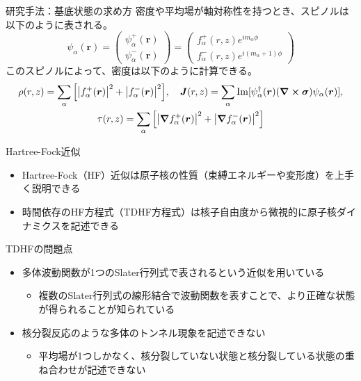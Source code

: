 \documentclass[12pt,aspectratio=169,xcolor=dvipsnames,table,dvipdfmx]{beamer}
\theoremstyle{definition}
\begin{document}
\begin{frame}{研究手法：基底状態の求め方}
密度や平均場が軸対称性を持つとき、スピノルは以下のように表される。
\begin{equation}
  \psi_{\alpha}(\bm{r}) =
  \begin{pmatrix}
    \psi_{\alpha}^{+}(\bm{r}) \\
    \psi_{\alpha}^{-}(\bm{r})
  \end{pmatrix}
  = 
  \begin{pmatrix}
    f^{+}_{\alpha}(r,z)e^{im_{\alpha}\phi} \\
    f^{-}_{\alpha}(r,z)e^{i(m_{\alpha}+1)\phi}
  \end{pmatrix}
\end{equation}
このスピノルによって、密度は以下のように計算できる。
\begin{gather}
  \rho(r,z) = \sum_{\alpha}\qty[\abs{f_{\alpha}^{+}(\bm{r})}^2+\abs{f_{\alpha}^{-}(\bm{r})}^2],\quad 
  \bm{J}(r,z) = \sum_{\alpha}\Im[\psi_{\alpha}^{\dagger}(\bm{r})(\bm{\nabla}\cross\bm{\sigma})\psi_{\alpha}(\bm{r})],\\
  \tau(r,z) = \sum_{\alpha}\qty[\abs{\bm{\nabla}f_{\alpha}^{+}(\bm{r})}^2+\abs{\bm{\nabla}f_{\alpha}^{-}(\bm{r})}^2]
\end{gather}
\end{frame}





\begin{frame}{Hartree-Fock近似}
  \begin{itemize}
    \item Hartree-Fock（HF）近似は原子核の性質（束縛エネルギーや変形度）を上手く説明できる
    \item 時間依存のHF方程式（TDHF方程式）は核子自由度から微視的に原子核ダイナミクスを記述できる
  \end{itemize}
  \begin{block}{TDHFの問題点}
    \begin{itemize}
      \item 多体波動関数が1つのSlater行列式で表されるという近似を用いている
            \begin{itemize}
              \item 複数のSlater行列式の線形結合で波動関数を表すことで、より正確な状態が得られることが知られている
            \end{itemize}
      \item 核分裂反応のような多体のトンネル現象を記述できない
            \begin{itemize}
              \item 平均場が1つしかなく、核分裂していない状態と核分裂している状態の重ね合わせが記述できない
            \end{itemize}
    \end{itemize}
  \end{block}
\end{frame}
\end{document}
